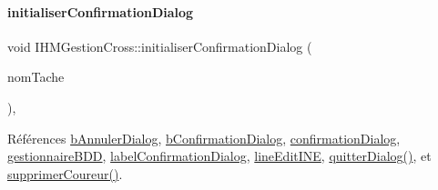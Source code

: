 \paragraph{\texorpdfstring{initialiser\+Confirmation\+Dialog}{initialiserConfirmationDialog}\hspace{0.1cm}{\footnotesize\ttfamily [1/2]}}
{\footnotesize\ttfamily void I\+H\+M\+Gestion\+Cross\+::initialiser\+Confirmation\+Dialog (\begin{DoxyParamCaption}\item[{Q\+String}]{nom\+Tache }\end{DoxyParamCaption})\hspace{0.3cm}{\ttfamily [private]}, {\ttfamily [slot]}}



Références \hyperlink{class_i_h_m_gestion_cross_a2efd604a10cae21b2f85e7196c3927fd}{b\+Annuler\+Dialog}, \hyperlink{class_i_h_m_gestion_cross_a8aaf51ea455654df21f65ed496384b60}{b\+Confirmation\+Dialog}, \hyperlink{class_i_h_m_gestion_cross_a417b63ff11c3be6623d17718d9058768}{confirmation\+Dialog}, \hyperlink{class_i_h_m_gestion_cross_a440bac63a3e51db3e2c08e883f8cafc9}{gestionnaire\+B\+DD}, \hyperlink{class_i_h_m_gestion_cross_a9b51d06493979981248ecc2641f82be4}{label\+Confirmation\+Dialog}, \hyperlink{class_i_h_m_gestion_cross_ab6c32fd079f81c4fa0b9ec0b4ef9bb61}{line\+Edit\+I\+NE}, \hyperlink{class_i_h_m_gestion_cross_a58b19fa84a16060a3dd951abeba2c543}{quitter\+Dialog()}, et \hyperlink{class_i_h_m_gestion_cross_a4fd00fda0e47366d66d046e344a1617e}{supprimer\+Coureur()}.


